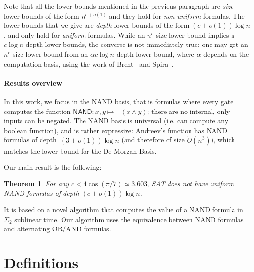 \documentclass[a4paper, 11pt]{article}
\theoremstyle{plain}
\newtheorem{theorem}{Theorem}[section] %
\theoremstyle{definition}
\theoremstyle{remark}
\newcommand{\Ot}[1]{\widetilde{O}\left( #1 \right)}%
\newcommand{\SAT}{\textsf{SAT}}%
\newcommand{\NAND}{\textsf{NAND}}%
\begin{document}
Note that all the lower bounds mentioned in the previous paragraph 
are \textit{size} lower bounds of the form $n^{c + o(1)}$
and they hold for \textit{non-uniform} formulas.  
The lower bounds that we give are \textit{depth} lower bounds of the form $(c + o(1))\log n$,
and only hold for \textit{uniform} formulas.
While an $n^c$ size lower bound implies a $c\log n$ depth lower bounds,
the converse is not immediately true; 
one may get an $n^c$ size lower bound from an
$\alpha c\log n$ depth lower bound, where $\alpha$ depends on the computation basis,
using the work of Brent~\cite{brent1974parallel} and Spira~\cite{spira1971time}.

\paragraph{Results overview}

In this work, we focus in the \NAND{} basis, 
that is formulas where every gate computes the function $\NAND: x,y\mapsto \neg(x\wedge y)$;
there are no internal, only inputs can be negated.
The \NAND{} basis is universal (i.e. can compute any boolean function), 
and is rather expressive: Andreev's function has \NAND{} formulas of depth~$(3+o(1)) \log n$
(and therefore of size $\Ot{n^3}$), which matches the lower bound for the De Morgan Basis.

Our main result is the following:
\begin{theorem}\label{thm:main}
	For any $c < 4 \cos(\pi/7) \simeq 3.603$, \SAT{} does not have 
	uniform \NAND{} formulas of depth $(c + o(1)) \log n$.
\end{theorem}

It is based on a novel algorithm that computes the 
value of a \NAND{} formula in $\Sigma_2$ sublinear time.
Our algorithm uses the equivalence between \NAND{} formulas and alternating OR/AND formulas.

\section{Definitions}
\end{document}
